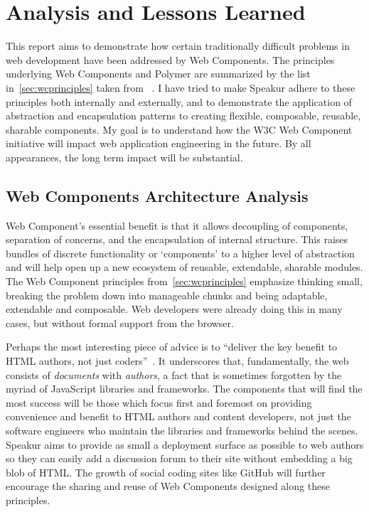 \chapter{Analysis and Lessons Learned}
%
\label{ch:analysis}

This report aims to demonstrate how certain traditionally difficult problems in web development have been addressed by Web Components.
The principles underlying Web Components and Polymer are summarized by the list in~\cref{sec:wcprinciples} taken from ~\cite{webcomponentscontributors2014}.
I have tried to make Speakur adhere to these principles both internally and externally,
and to demonstrate the application of abstraction and encapsulation patterns to creating flexible, composable, reusable, sharable components.
My goal is to understand how the W3C Web Component initiative will impact web application engineering in the future.
By all appearances, the long term impact will be substantial.

\section{Web Components Architecture Analysis}
Web Component's essential benefit is that it allows decoupling of components, 
separation of concerns, 
and the encapsulation of internal structure.
This raises bundles of discrete functionality or `components' to a higher level of abstraction and 
will help open up a new ecosystem of reusable, extendable, sharable modules.
The Web Component principles from~\cref{sec:wcprinciples} emphasize thinking small, 
breaking the problem down into manageable chunks and being adaptable, extendable and composable.
Web developers were already doing this in many cases, but without formal support from the browser.

Perhaps the most interesting piece of advice is to ``deliver the key benefit to HTML authors, not just coders''~\cite{webcomponentscontributors2014}.
It underscores that, fundamentally, 
the web consists of \textit{documents} with \textit{authors}, 
a fact that is sometimes forgotten by the myriad of JavaScript libraries and frameworks.
The components that will find the most success will be those which focus first and foremost on providing convenience and benefit to HTML authors and content developers, 
not just the software engineers who maintain the libraries and frameworks behind the scenes.
Speakur aims to provide as small a deployment surface as possible to web authors so they can easily add a discussion forum to their site without embedding a big blob of HTML.
The growth of social coding sites like GitHub will further encourage the sharing and reuse of Web Components designed along these principles.

